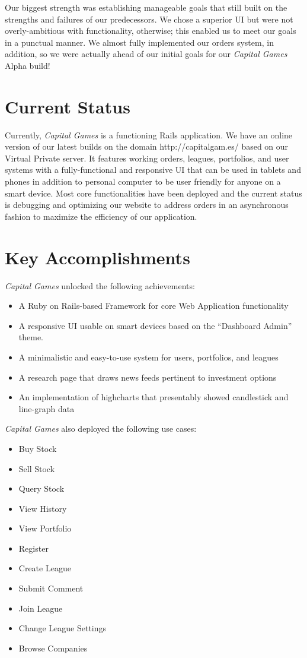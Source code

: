 Our biggest strength was establishing manageable goals that still built on 
the strengths and failures of our predecessors. We chose a superior UI but 
were not overly-ambitious with functionality, otherwise; 
this enabled us to meet our goals in a punctual manner. We almost fully 
implemented our orders system, in addition, so we were actually ahead of 
our initial goals for our \textit{Capital Games} Alpha build!

\section{Current Status}

Currently, \textit{Capital Games} is a functioning Rails application. We have an 
online version of our latest builds on the domain http://capitalgam.es/ based on 
our Virtual Private server. It features working orders, leagues, portfolios, and 
user systems with a fully-functional and responsive UI that can be used in tablets 
and phones in addition to personal computer to be user friendly for anyone on a 
smart device. Most core functionalities have been deployed and the current status is 
debugging and optimizing our website to address orders in an asynchronous fashion 
to maximize the efficiency of our application. 

\section{Key Accomplishments}

\textit{Capital Games} unlocked the following achievements:

\begin{itemize}
	\item{A Ruby on Rails-based Framework for core Web Application functionality}
	\item{A responsive UI usable on smart devices based on the ``Dashboard Admin'' theme.}
	\item{A minimalistic and easy-to-use system for users, portfolios, and leagues}
	\item{A research page that draws news feeds pertinent to investment options}
	\item{An implementation of highcharts that presentably showed candlestick and line-graph data }
\end{itemize}

\textit{Capital Games} also deployed the following use cases:

\begin{itemize}
	\item{Buy Stock}
	\item{Sell Stock}
	\item{Query Stock}
	\item{View History}
	\item{View Portfolio}
	\item{Register}
	\item{Create League}
	\item{Submit Comment}
	\item{Join League}
	\item{Change League Settings}
	\item{Browse Companies}
\end{itemize}


